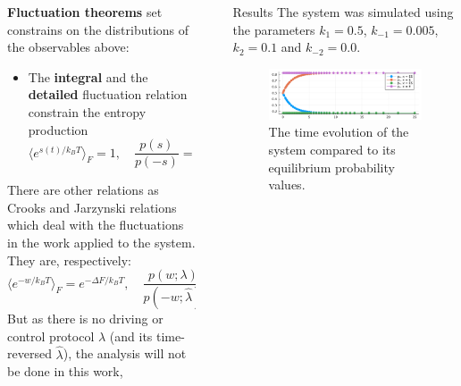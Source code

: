 \documentclass[final]{beamer}
\newlength{\sepwidth}
\newlength{\colwidth}
\newcommand{\separatorcolumn}{\begin{column}{\sepwidth}\end{column}}
\begin{document}
\begin{frame}[t]
\begin{columns}[t]
\begin{column}{\colwidth}
\begin{block}{}
{\bf Fluctuation theorems} set constrains on the distributions of the observables above:
\begin{itemize}
\item The {\bf integral} and the {\bf detailed} fluctuation relation constrain the entropy production\cite{peliti2021stochastic}
\begin{equation}
\langle e^{s(t)/k_BT} \rangle_F = 1, \quad \frac{p(s)}{p(-s)} = e^{s/k_B T}.
\end{equation}
%
\end{itemize}
%
There are other relations as Crooks and Jarzynski relations which deal with the fluctuations in the work applied to the system. They are, respectively:
%
\begin{equation*}
\langle e^{-w/k_B T} \rangle_F = e^{-\Delta F/k_BT}, \quad \frac{p(w;\lambda)}{p(-w;\hat{\lambda})} = e^{(w - \Delta F)/k_B T}.
\end{equation*}
%
But as there is no driving or control protocol $\lambda$ (and its time-reversed $\hat{\lambda}$), the analysis will not be done in this work,
\end{block}

\end{column}

\separatorcolumn

\begin{column}{\colwidth}

\begin{block}{Results}
The system was simulated using the parameters  $k_{1} = 0.5$, $k_{-1} = 0.005$, $k_{2} = 0.1$ and $k_{-2} = 0.0$.
\begin{figure}
\begin{center}
%
\includegraphics[scale=1.2]{graphics/f1.pdf}
\end{center}
\label{fig 2-state-system}
\caption{The time evolution of the system compared to its equilibrium probability values.}
\end{figure}


\end{block}
\end{column}
\end{columns}
\end{frame}
\end{document}
